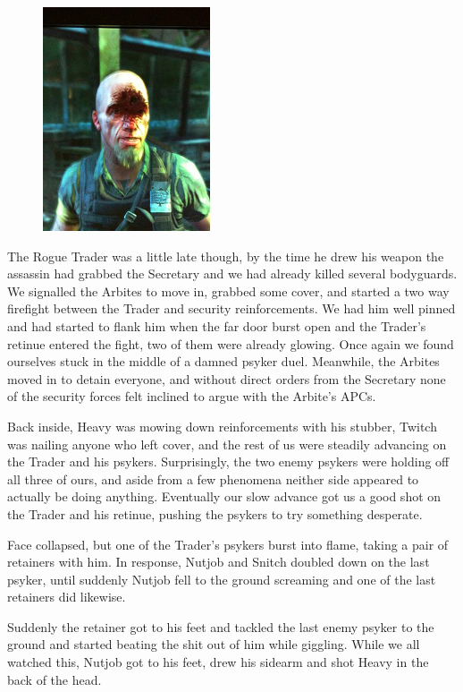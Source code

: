 \begin{figure}
\begin{center}
	\includegraphics[width=\figwidth]{pics/3/24.png}
\end{center}
\end{figure}
The Rogue Trader was a little late though, by the time he drew his weapon the assassin had grabbed the Secretary and we had already killed several bodyguards. 
We signalled the Arbites to move in, grabbed some cover, and started a two way firefight between the Trader and security reinforcements. 
We had him well pinned and had started to flank him when the far door burst open and the Trader’s retinue entered the fight, two of them were already glowing. 
Once again we found ourselves stuck in the middle of a damned psyker duel. 
Meanwhile, the Arbites moved in to detain everyone, and without direct orders from the Secretary none of the security forces felt inclined to argue with the Arbite’s APCs. 

Back inside, Heavy was mowing down reinforcements with his stubber, Twitch was nailing anyone who left cover, and the rest of us were steadily advancing on the Trader and his psykers. 
Surprisingly, the two enemy psykers were holding off all three of ours, and aside from a few phenomena neither side appeared to actually be doing anything. 
Eventually our slow advance got us a good shot on the Trader and his retinue, pushing the psykers to try something desperate.

Face collapsed, but one of the Trader’s psykers burst into flame, taking a pair of retainers with him. 
In response, Nutjob and Snitch doubled down on the last psyker, until suddenly Nutjob fell to the ground screaming and one of the last retainers did likewise.

Suddenly the retainer got to his feet and tackled the last enemy psyker to the ground and started beating the shit out of him while giggling. 
While we all watched this, Nutjob got to his feet, drew his sidearm and shot Heavy in the back of the head.

